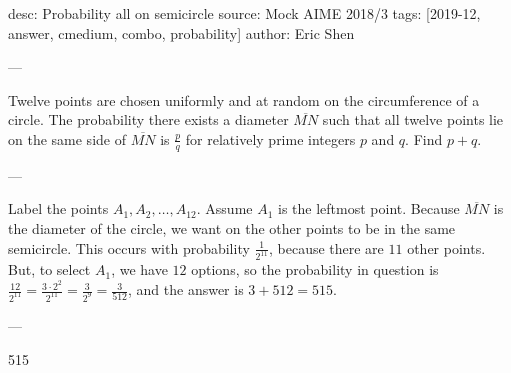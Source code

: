 desc: Probability all on semicircle
source: Mock AIME 2018/3
tags: [2019-12, answer, cmedium, combo, probability]
author: Eric Shen

---

Twelve points are chosen uniformly and at random on the circumference of a circle. The probability there exists a diameter $\overline{MN}$ such that all twelve points lie on the same side of $\overline{MN}$ is $\frac{p}{q}$ for relatively prime integers $p$ and $q$. Find $p+q$.

---

Label the points $A_1,A_2,\ldots,A_{12}$. Assume $A_1$ is the leftmost point. Because $\overline{MN}$ is the diameter of the circle, we want on the other points to be in the same semicircle. This occurs with probability $\frac{1}{2^{11}}$, because there are $11$ other points. But, to select $A_1$, we have $12$ options, so the probability in question is $\frac{12}{2^{11}}=\frac{3\cdot 2^2}{2^{11}}=\frac{3}{2^9}=\frac{3}{512}$, and the answer is $3+512=515$.

---

515
